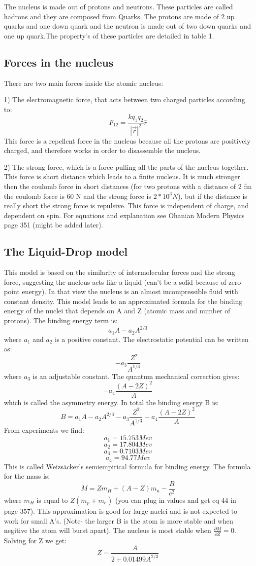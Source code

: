 \documentclass[]{article}
\begin{document}
The nucleus is made out of protons and neutrons. These particles are called hadrons and they are composed from Quarks. The protons are made of 2 up quarks and one down quark and the neutron is made out of two down quarks and one up quark.The property's of these particles are detailed in table 1.


\subsection{Forces in the nucleus}

There are two main forces inside the atomic nucleus:

1) The electromagnetic force, that acts between two charged particles according to: $$F_{12}=\frac{kq_1q_2}{|\vec{r}|^2}\hat{r}$$ This force is a repellent force in the nucleus because all the protons are positively charged, and therefore works in order to disassemble the nucleus.

2) The strong force, which is a force pulling all the parts of the nucleus together. This force is short distance which leads to a finite nucleus. It is much stronger then the coulomb force in short distances (for two protons with a distance of 2 fm the coulomb force is 60 N and the strong force is $2*10^{3} N$), but if the distance is really short the strong force is repulsive. This force is independent of charge, and dependent on spin. For equations and explanation see Ohanian Modern Physics page 351 (might be added later).

\subsection{The Liquid-Drop model}

This model is based on the similarity of intermolecular forces and the strong force, suggesting the nucleus acts like a liquid (can't be a solid because of zero point energy). In that view the nucleus is an almost incompressible fluid with constant density. This model leads to an approximated formula for the binding energy of the nuclei that depends on A and Z (atomic mass and number of protons). The binding energy term is: $$a_1A-a_2A^{2/3}$$ where $a_1$ and $a_2$ is a positive constant. The electrostatic potential can be written as: $$-a_3\frac{Z^2}{A^{1/3}}$$ where $a_3$ is an adjustable constant. The quantum mechanical correction gives: $$-a_4\frac{(A-2Z)^2}{A}$$ which is called the asymmetry energy. In total the binding energy B is: $$B=a_1A-a_2A^{2/3}-a_3\frac{Z^2}{A^{1/3}}-a_4\frac{(A-2Z)^2}{A}$$ From experiments we find: $$a_1=15.753Mev$$ $$a_2=17.804Mev$$ $$a_3=0.7103Mev$$ $$a_4=94.77Mev$$ This is called Weizs\"acker's semiempirical formula for binding energy. The formula for the mass is: $$M=Zm_H+(A-Z)m_n-\frac{B}{c^2}$$ where $m_H$ is equal to $Z(m_p+m_e)$ (you can plug in values and get eq 44 in page 357).
This approximation is good for large nuclei and is not expected to work for small A's. (Note- the larger B is the atom is more stable and when negitive the atom will burst apart). The nucleus is most stable when $\frac{\partial M}{\partial Z}=0$. Solving for Z we get: $$Z=\frac{A}{2+0.01499A^{2/3}}$$
\end{document}
